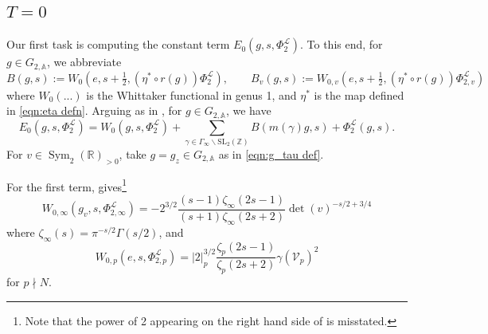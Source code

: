 \documentclass[reqno,oneside]{amsart}
\theoremstyle{plain}
\theoremstyle{remark}
\numberwithin{theorem}{section}
\newcommand{\bbA}{\mathbb A}
\newcommand{\bbR}{\mathbb R}
\newcommand{\bbZ}{\mathbb Z}
\newcommand{\calL}{\mathcal L}
\newcommand{\calV}{\mathcal V}
\DeclareMathOperator{\Sym}{Sym}
\begin{document}
	\subsection{$T=0$}
	Our first task is computing the constant term $E_0(g,s,\Phi^{\calL}_2)$. To this end, for $g \in G_{2,\bbA}$, we abbreviate
	\begin{equation}
	B(g,s) := W_0\left(e, s+\tfrac12, (\eta^* \circ r(g)) \Phi^{\calL}_2 \right) , \qquad 	B_v(g,s) := W_{0,v}\left(e, s+\tfrac12, (\eta^* \circ r(g)) \Phi^{\calL}_{2,v} \right)
	\end{equation}
	where $W_0(...)$ is the Whittaker functional in genus 1, and $\eta^*  $ is the map defined in \eqref{eqn:eta defn}.
	Arguing as in \cite[\S 5.9]{KRYbook},  for $g \in G_{2, \bbA}$, we have
	\begin{equation} \label{eqn:E0 decomposition}
	E_0(g,s,\Phi_2^{\calL}) = W_0(g,s, \Phi_2^{\calL}) + \sum_{\gamma \in \Gamma_{\infty} \backslash \mathrm{SL}_2(\bbZ)}  B(m(\gamma) g, s) + \Phi_2^{\calL}(g,s).
	\end{equation}
	For $v \in \Sym_2(\bbR)_{>0}$, take $g = g_z \in G_{2,\bbA}$ as in  \eqref{eqn:g_tau def}.
	
	For the first term, \cite[(5.9.3)]{KRYbook} gives\footnote{Note that the power of 2 appearing on the right hand side of \cite[(5.9.3)]{KRYbook} is misstated.}
	\begin{equation}
	W_{0,\infty}(g_v, s, \Phi_{2,\infty}^{\calL}) = - 2^{3/2} \frac{(s-1) \zeta_{\infty}(2s-1)}{(s+1) \zeta_{\infty}(2s+2)} \det(v)^{-s/2+3/4}
	\end{equation}
	where $\zeta_{\infty}(s) = \pi^{-s/2} \Gamma(s/2)$, and 	
	\begin{equation}
	W_{0,p}(e, s, \Phi^{\calL}_{2,p}) = |2|_p^{3/2}\frac{\zeta_p(2s-1)}{\zeta_p(2s+2)} \gamma(\calV_p)^2
	\end{equation}	
	for $p \nmid N$.
	
\end{document}
